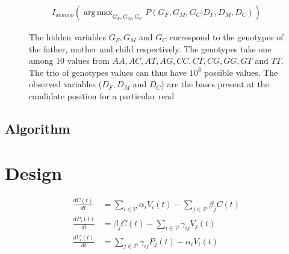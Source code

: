\documentclass{article}
\DeclareMathOperator*{\argmax}{arg\,max}
\begin{document}
\begin{align}
I_{denovo}(\argmax_{G_F,G_M,G_C} P(G_F,G_M,G_C|D_F,D_M,D_C))
\end{align}


\begin{figure}
\centering
{}
\caption{The hidden variables $G_{F}, G_{M}$ and $G_{C}$ correspond to the genotypes of the father, mother and child respectively. The genotypes take one among 10 values from $AA, AC, AT, AG, CC, CT, CG, GG, GT$ and $TT$. The trio of genotypes values can thus have $10^3$ possible values. The observed variables ($D_F, D_M$ and $D_C$) are the bases present at the candidate position for a particular read }
\label{fig:bayesnet}
\end{figure}

\subsection{Algorithm}

\section{Design}




\begin{align}\label{eqn:diffeq}
\frac{dC(t)}{dt}  &= \sum_{i \in \mathcal{V}}\alpha_i V_i(t) - \sum_{j \in \mathcal{P}}\beta_j C(t)\\
\frac{dP_j(t)}{dt}  &= \beta_j C(t) - \sum_{i \in \mathcal{V}}\gamma_{ij}V_j(t) \\
\frac{dV_i(t)}{dt}  &= \sum_{j \in \mathcal{P}}\gamma_{ij}P_j(t) - \alpha_i V_i(t)
\end{align}
\end{document}
